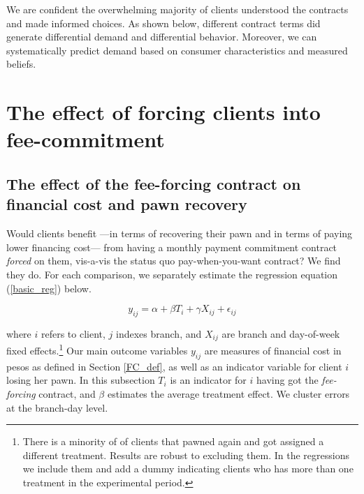 \documentclass[oneside,11pt]{article}
\begin{document}
We are confident the overwhelming majority of clients understood the contracts and made informed choices. As shown below, different contract terms did generate differential demand and differential behavior. Moreover, we can systematically predict demand based on consumer characteristics and measured beliefs.



\section{The effect of forcing clients into fee-commitment} \label{fee-commitment}



\subsection{The effect of the fee-forcing contract on financial cost and pawn recovery} \label{TE_fee-forcing}

Would clients benefit ---in terms of recovering their pawn and in terms of paying lower financing cost--- from having a monthly payment commitment contract \textit{forced} on them, vis-a-vis the status quo pay-when-you-want contract? We find they do. For each comparison, we separately estimate the regression equation (\ref{basic_reg}) below.

\begin{equation} \label{basic_reg}
    y_{ij} = \alpha + \beta T_{i} + \gamma X_{ij} + \epsilon_{ij}
\end{equation}

\noindent where $i$ refers to client, $j$ indexes branch, and $X_{ij}$ are branch and day-of-week fixed effects.\footnote{There is a minority of of clients that pawned again and got assigned a different treatment. Results are robust to excluding them. In the regressions we include them and add a dummy indicating clients who has more than one treatment in the experimental period.} %
Our main outcome variables $y_{ij}$ are measures of financial cost in pesos as defined in Section \ref{FC_def}, as well as an indicator variable for client $i$ losing her pawn. In this subsection $T_{i}$ is an indicator for $i$ having got the \textit{fee-forcing} contract, and $\beta$ estimates the average treatment effect. We cluster errors at the branch-day level.%
\end{document}
